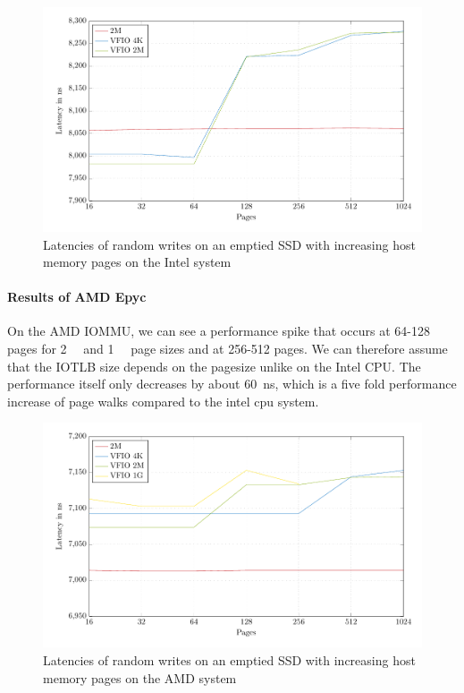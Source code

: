 \begin{figure}
  \centering
  \includegraphics[width=\textwidth]{figures/psmeds}
  \caption{Latencies of random writes on an emptied SSD with increasing host memory pages on the Intel system}
  \label{fig:med-ps}
\end{figure}

\paragraph{Results of AMD Epyc}

On the AMD IOMMU, we can see a performance spike that occurs at 64-128 pages for \qty{2}{\mebi\byte} and \qty{1}{\gibi\byte} page sizes and at 256-512 pages. We can therefore assume that the IOTLB size depends on the pagesize unlike on the Intel CPU. The performance itself only decreases by about \qty{60}{ns}, which is a five fold performance increase of page walks compared to the intel cpu system.

\begin{figure}
  \centering
  \includegraphics[width=\textwidth]{figures/psmedsepyc}
  \caption{Latencies of random writes on an emptied SSD with increasing host memory pages on the AMD system}
  \label{fig:med-psepyc}
\end{figure}

